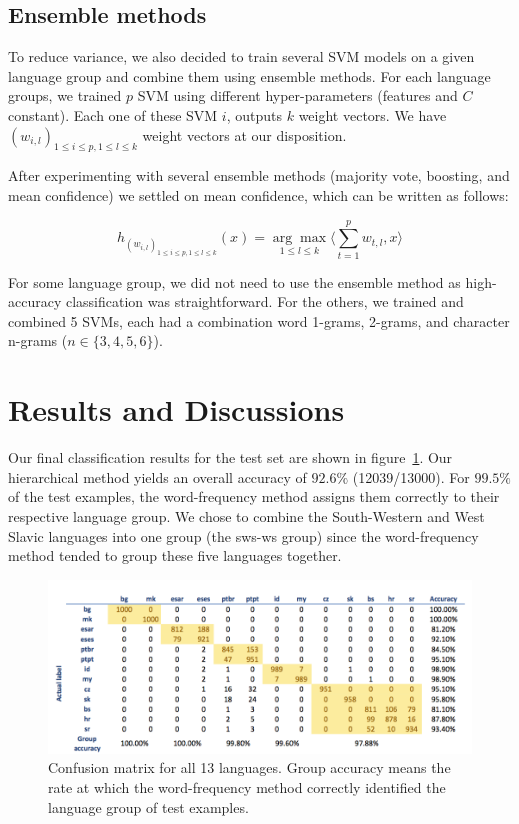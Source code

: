\documentclass{article}
\begin{document}
\subsection{Ensemble methods}

To reduce variance, we also decided to train several SVM models on a given language group and combine them using ensemble methods. For each language groups, we trained $p$ SVM using different hyper-parameters (features and $C$ constant). Each one of these SVM $i$, outputs $k$ weight vectors. We have $\left(w_{i,l}\right)_{1\leq i \leq p, 1 \leq l \leq k}$ weight vectors at our disposition.

After experimenting with several ensemble methods (majority vote, boosting, and mean confidence) we settled on mean confidence, which can be written as follows:

$$h_{\left(w_{i,l}\right)_{1\leq i \leq p, 1 \leq l \leq k}}(x) = \underset{1\leq l \leq k}{\mathrm{\arg \max}} \langle \sum\limits_{t=1}^p w_{t,l}, x\rangle$$

For some language group, we did not need to use the ensemble method as high-accuracy classification was straightforward. For the others, we trained and combined 5 SVMs, each had a combination word 1-grams, 2-grams, and character n-grams ($n \in \{3,4,5,6\}$).

\section{Results and Discussions}\label{discussion}
Our final classification results for the test set are shown in figure~\ref{fig:ConfMat}. Our hierarchical method yields an overall accuracy of $92.6\%$ (12039/13000). For $99.5\%$ of the test examples, the word-frequency method assigns them correctly to their respective language group. We chose to combine the South-Western and West Slavic languages into one group (the sws-ws group) since the word-frequency method tended to group these five languages together. 
\begin{figure}[h!]
\centering
\includegraphics[scale = 0.4]{Final_confusion_matrix.png}
\caption{Confusion matrix for all 13 languages. Group accuracy means the rate at which the word-frequency method correctly identified the language group of test examples.}
\label{fig:ConfMat}
\end{figure}
\end{document}
